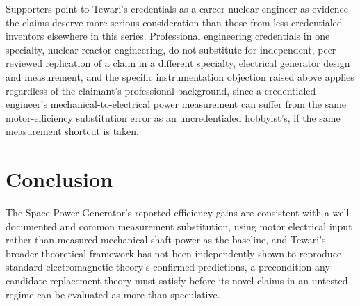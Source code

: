 \documentclass[11pt]{article}
\begin{document}
Supporters point to Tewari's credentials as a career nuclear engineer as evidence the claims deserve more serious consideration than those from less credentialed inventors elsewhere in this series. Professional engineering credentials in one specialty, nuclear reactor engineering, do not substitute for independent, peer-reviewed replication of a claim in a different specialty, electrical generator design and measurement, and the specific instrumentation objection raised above applies regardless of the claimant's professional background, since a credentialed engineer's mechanical-to-electrical power measurement can suffer from the same motor-efficiency substitution error as an uncredentialed hobbyist's, if the same measurement shortcut is taken.

\section{Conclusion}

The Space Power Generator's reported efficiency gains are consistent with a well documented and common measurement substitution, using motor electrical input rather than measured mechanical shaft power as the baseline, and Tewari's broader theoretical framework has not been independently shown to reproduce standard electromagnetic theory's confirmed predictions, a precondition any candidate replacement theory must satisfy before its novel claims in an untested regime can be evaluated as more than speculative.
\end{document}
